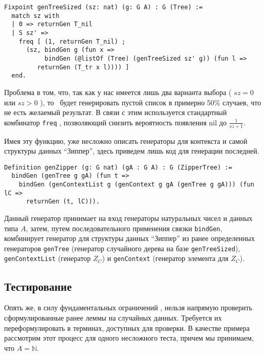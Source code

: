 \begin{lstlisting}
Fixpoint genTreeSized (sz: nat) (g: G A) : G (Tree) :=
  match sz with
  | 0 => returnGen T_nil
  | S sz' =>
    freq [ (1, returnGen T_nil) ;
      (sz, bindGen g (fun x =>
           bindGen (@listOf (Tree) (genTreeSized sz' g)) (fun l =>
         returnGen (T_tr x l)))) ]
  end.
\end{lstlisting}

Проблема в том, что, так как у нас имеется лишь два варианта выбора ( $sz = 0$ или $sz > 0$ ), то \tqc~будет генерировать пустой список в примерно 50\% случаев, что не есть желаемый результат. В связи с этим используется стандартный комбинатор \texttt{freq} \autocite{QuickChickRM}, позволяющий снизить вероятность появления nil до $\frac{1}{sz + 1}$.

Имея эту функцию, уже несложно описать генераторы для контекста и самой структуры данных ``Зиппер'', здесь приведем лишь код для генерации последней.
\begin{lstlisting}
Definition genZipper (g: G nat) (gA : G A) : G (ZipperTree) :=
  bindGen (genTree g gA) (fun t =>
    bindGen (genContextList g (genContext g gA (genTree g gA))) (fun lC =>
      returnGen (t, lC))).
\end{lstlisting}

Данный генератор принимает на вход генераторы натуральных чисел и данных типа $A$, затем, путем последовательного применения связки \texttt{bindGen}, комбинирует генератор для структуры данных ``Зиппер'' из ранее определенных генераторов \texttt{genTree} (генератор случайного дерева на базе \texttt{genTreeSized}), \texttt{genContextList} (генератор $Z_C$) и \texttt{genContext} (генератор элемента для $Z_C$).

\subsection{Тестирование}

Опять же, в силу фундаментальных ограничений \tqc, нельзя напрямую проверить сформулированные ранее леммы на случайных данных. Требуется их переформулировать в терминах, доступных для проверки. В качестве примера рассмотрим этот процесс для одного несложного теста, причем мы принимаем, что $A = \mathbb{N}$.

